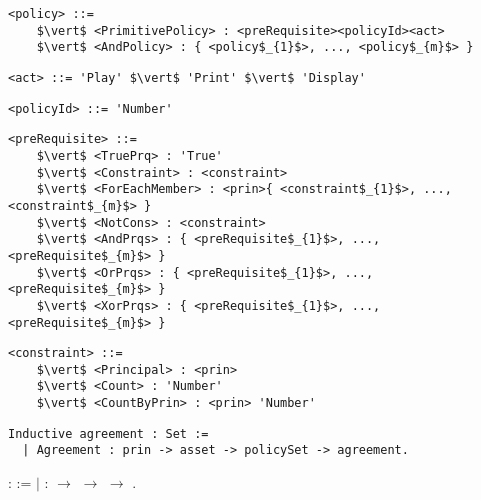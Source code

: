 
\lstset{mathescape, language=AST}  
\begin{lstlisting}[caption={policy},label={lst:policy}]
<policy> ::=  
	$\vert$ <PrimitivePolicy> : <preRequisite><policyId><act>
	$\vert$ <AndPolicy> : { <policy$_{1}$>, ..., <policy$_{m}$> }	
\end{lstlisting}


\lstset{mathescape, language=AST}  
\begin{lstlisting}[caption={act},label={lst:act}]
<act> ::= 'Play' $\vert$ 'Print' $\vert$ 'Display'
\end{lstlisting}


\lstset{mathescape, language=AST}  
\begin{lstlisting}[caption={policyId},label={lst:policyId}]
<policyId> ::= 'Number'
\end{lstlisting}



\lstset{mathescape, language=AST}  
\begin{lstlisting}[caption={preRequisite},label={lst:preRequisite}]
<preRequisite> ::=  
	$\vert$ <TruePrq> : 'True'
	$\vert$ <Constraint> : <constraint>	 
	$\vert$ <ForEachMember> : <prin>{ <constraint$_{1}$>, ..., <constraint$_{m}$> }	
	$\vert$ <NotCons> : <constraint>
	$\vert$ <AndPrqs> : { <preRequisite$_{1}$>, ..., <preRequisite$_{m}$> }		 
	$\vert$ <OrPrqs> : { <preRequisite$_{1}$>, ..., <preRequisite$_{m}$> }	
	$\vert$ <XorPrqs> : { <preRequisite$_{1}$>, ..., <preRequisite$_{m}$> }		
\end{lstlisting}


\lstset{mathescape, language=AST}  
\begin{lstlisting}[caption={constraint},label={lst:constraint}]
<constraint> ::=  
	$\vert$ <Principal> : <prin>
	$\vert$ <Count> : 'Number'	 
	$\vert$ <CountByPrin> : <prin> 'Number'
\end{lstlisting}


\lstset{language=Coq}
\begin{lstlisting}[caption={First Coq Listing},label={lst:coqwww}]
Inductive agreement : Set :=
  | Agreement : prin -> asset -> policySet -> agreement.
\end{lstlisting}

\coqdoceol
\coqdocemptyline
\coqdocnoindent
{}  :  :=\coqdoceol
\coqdocindent{1.00em}
\ensuremath{|}  :  \ensuremath{\rightarrow}  \ensuremath{\rightarrow}  \ensuremath{\rightarrow} .\coqdoceol
\coqdocemptyline
\coqdocemptyline

